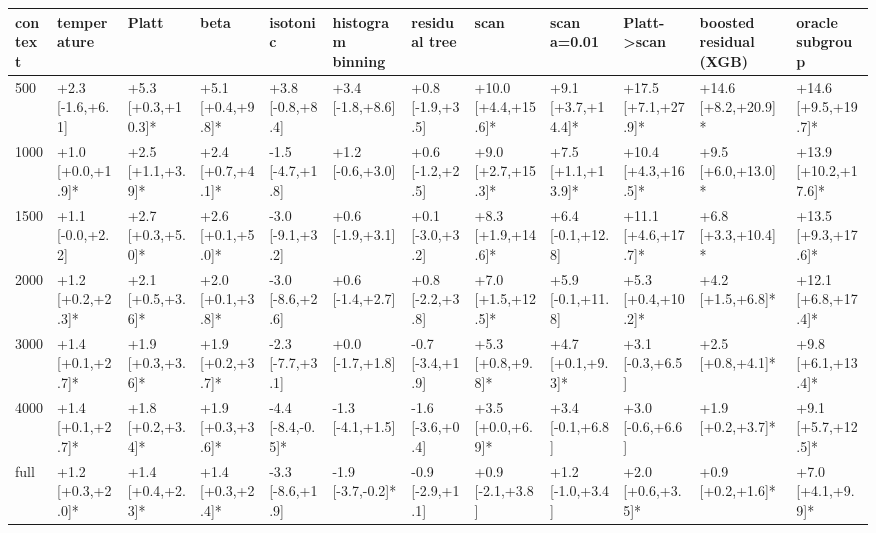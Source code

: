 \begin{tabular}{llllllllllll}
\toprule
context & temperature & Platt & beta & isotonic & histogram binning & residual tree & scan & scan a=0.01 & Platt->scan & boosted residual (XGB) & oracle subgroup \\
\midrule
500 & +2.3 [-1.6,+6.1] & +5.3 [+0.3,+10.3]* & +5.1 [+0.4,+9.8]* & +3.8 [-0.8,+8.4] & +3.4 [-1.8,+8.6] & +0.8 [-1.9,+3.5] & +10.0 [+4.4,+15.6]* & +9.1 [+3.7,+14.4]* & +17.5 [+7.1,+27.9]* & +14.6 [+8.2,+20.9]* & +14.6 [+9.5,+19.7]* \\
1000 & +1.0 [+0.0,+1.9]* & +2.5 [+1.1,+3.9]* & +2.4 [+0.7,+4.1]* & -1.5 [-4.7,+1.8] & +1.2 [-0.6,+3.0] & +0.6 [-1.2,+2.5] & +9.0 [+2.7,+15.3]* & +7.5 [+1.1,+13.9]* & +10.4 [+4.3,+16.5]* & +9.5 [+6.0,+13.0]* & +13.9 [+10.2,+17.6]* \\
1500 & +1.1 [-0.0,+2.2] & +2.7 [+0.3,+5.0]* & +2.6 [+0.1,+5.0]* & -3.0 [-9.1,+3.2] & +0.6 [-1.9,+3.1] & +0.1 [-3.0,+3.2] & +8.3 [+1.9,+14.6]* & +6.4 [-0.1,+12.8] & +11.1 [+4.6,+17.7]* & +6.8 [+3.3,+10.4]* & +13.5 [+9.3,+17.6]* \\
2000 & +1.2 [+0.2,+2.3]* & +2.1 [+0.5,+3.6]* & +2.0 [+0.1,+3.8]* & -3.0 [-8.6,+2.6] & +0.6 [-1.4,+2.7] & +0.8 [-2.2,+3.8] & +7.0 [+1.5,+12.5]* & +5.9 [-0.1,+11.8] & +5.3 [+0.4,+10.2]* & +4.2 [+1.5,+6.8]* & +12.1 [+6.8,+17.4]* \\
3000 & +1.4 [+0.1,+2.7]* & +1.9 [+0.3,+3.6]* & +1.9 [+0.2,+3.7]* & -2.3 [-7.7,+3.1] & +0.0 [-1.7,+1.8] & -0.7 [-3.4,+1.9] & +5.3 [+0.8,+9.8]* & +4.7 [+0.1,+9.3]* & +3.1 [-0.3,+6.5] & +2.5 [+0.8,+4.1]* & +9.8 [+6.1,+13.4]* \\
4000 & +1.4 [+0.1,+2.7]* & +1.8 [+0.2,+3.4]* & +1.9 [+0.3,+3.6]* & -4.4 [-8.4,-0.5]* & -1.3 [-4.1,+1.5] & -1.6 [-3.6,+0.4] & +3.5 [+0.0,+6.9]* & +3.4 [-0.1,+6.8] & +3.0 [-0.6,+6.6] & +1.9 [+0.2,+3.7]* & +9.1 [+5.7,+12.5]* \\
full & +1.2 [+0.3,+2.0]* & +1.4 [+0.4,+2.3]* & +1.4 [+0.3,+2.4]* & -3.3 [-8.6,+1.9] & -1.9 [-3.7,-0.2]* & -0.9 [-2.9,+1.1] & +0.9 [-2.1,+3.8] & +1.2 [-1.0,+3.4] & +2.0 [+0.6,+3.5]* & +0.9 [+0.2,+1.6]* & +7.0 [+4.1,+9.9]* \\
\bottomrule
\end{tabular}
